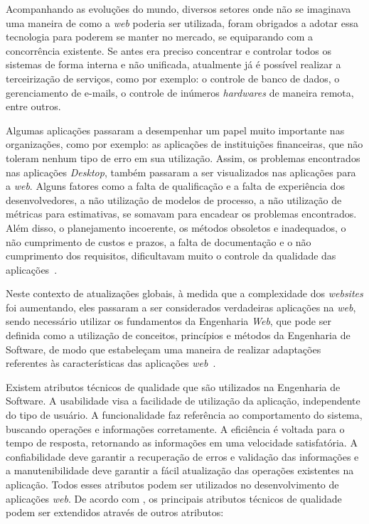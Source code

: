 Acompanhando as evoluções do mundo, diversos setores onde não se imaginava uma maneira de como a \textit{web} poderia ser utilizada, foram obrigados a adotar essa tecnologia para poderem se manter no mercado, se equiparando com a concorrência existente. Se antes era preciso concentrar e controlar todos os sistemas de forma interna e não unificada, atualmente já é possível realizar a terceirização de serviços, como por exemplo: o controle de banco de dados, o gerenciamento de e-mails, o controle de inúmeros \textit{hardwares} de maneira remota, entre outros.

Algumas aplicações passaram a desempenhar um papel muito importante nas organizações, como por exemplo: as aplicações de instituições financeiras, que não toleram nenhum tipo de erro em sua utilização. Assim, os problemas encontrados nas aplicações \textit{Desktop}, também passaram a ser visualizados nas aplicações para a \textit{web}. Alguns fatores como a falta de qualificação e a falta de experiência dos desenvolvedores, a não utilização de modelos de processo, a não utilização de métricas para estimativas, se somavam para encadear os problemas encontrados. Além disso, o planejamento incoerente, os métodos obsoletos e inadequados, o não cumprimento de custos e prazos, a falta de documentação e o não cumprimento dos requisitos, dificultavam muito o controle da qualidade das aplicações~\cite{peruch-pg07}.               

Neste contexto de atualizações globais, à medida que a complexidade dos \textit{websites} foi aumentando, eles passaram a ser considerados verdadeiras aplicações na \textit{web}, sendo necessário utilizar os fundamentos da Engenharia \textit{Web}, que pode ser definida como a utilização de conceitos, princípios e métodos da Engenharia de Software, de modo que estabeleçam uma maneira de realizar adaptações referentes às características das aplicações \textit{web}~\cite{beder:ew12}.

Existem atributos técnicos de qualidade que são utilizados na Engenharia de Software. A usabilidade visa a facilidade de utilização da aplicação, independente do tipo de usuário. A funcionalidade faz referência ao comportamento do sistema, buscando operações e informações corretamente. A eficiência é voltada para o tempo de resposta, retornando as informações em uma velocidade satisfatória. A confiabilidade deve garantir a recuperação de erros e validação das informações e a manutenibilidade deve garantir a fácil atualização das operações existentes na aplicação. Todos esses atributos podem ser utilizados no desenvolvimento de aplicações \textit{web}. De acordo com , os principais atributos técnicos de qualidade podem ser extendidos através de outros atributos: 

